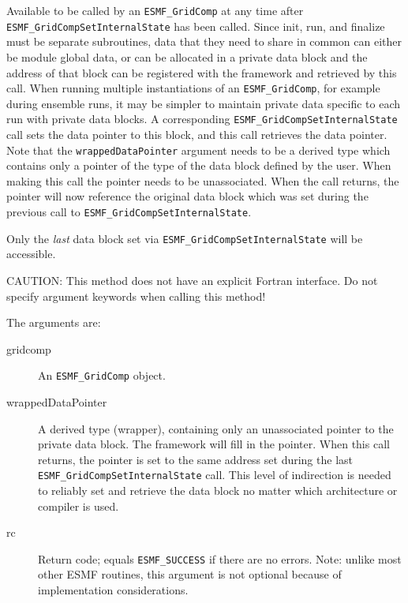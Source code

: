    Available to be called by an {\tt ESMF\_GridComp} at any time after
   {\tt ESMF\_GridCompSetInternalState} has been called.
   Since init, run, and finalize must be separate subroutines, data that
   they need to share in common can either be module global data, or can
   be allocated in a private data block and the address of that block
   can be registered with the framework and retrieved by this call.
   When running multiple instantiations of an {\tt ESMF\_GridComp},
   for example during ensemble runs,
   it may be simpler to maintain private data specific to
   each run with private data blocks.  A corresponding
   {\tt ESMF\_GridCompSetInternalState} call sets the data pointer to
   this block, and this call retrieves the data pointer.
   Note that the {\tt wrappedDataPointer} argument needs to be a derived type
   which contains only a pointer of the type of the data block defined
   by the user.  When making this call the pointer needs to be unassociated.
   When the call returns, the pointer will now reference the original
   data block which was set during the previous call to
   {\tt ESMF\_GridCompSetInternalState}.
  
   Only the {\em last} data block set via
   {\tt ESMF\_GridCompSetInternalState} will be accessible.
  
   CAUTION: This method does not have an explicit Fortran interface. Do not
   specify argument keywords when calling this method!
  
   The arguments are:
   \begin{description}
   \item[gridcomp]
     An {\tt ESMF\_GridComp} object.
   \item[wrappedDataPointer]
     A derived type (wrapper), containing only an unassociated pointer
     to the private data block.
     The framework will fill in the pointer. When this call returns, the
     pointer is set to the same address set during the last
     {\tt ESMF\_GridCompSetInternalState} call.
     This level of indirection is needed to reliably set and retrieve
     the data block no matter which architecture or compiler is used.
   \item[rc]
     Return code; equals {\tt ESMF\_SUCCESS} if there are no errors.
     Note: unlike most other ESMF routines, this argument is not optional
     because of implementation considerations.
   \end{description}
   
 
